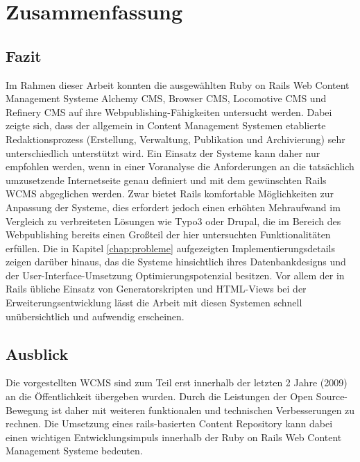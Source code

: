 \chapter{Zusammenfassung}

\section{Fazit}

Im Rahmen dieser Arbeit konnten die ausgewählten Ruby on Rails Web Content Management Systeme Alchemy CMS, Browser CMS, Locomotive CMS und Refinery CMS auf ihre Webpublishing-Fähigkeiten untersucht werden. Dabei zeigte sich, dass der allgemein in Content Management Systemen etablierte Redaktionsprozess (Erstellung, Verwaltung, Publikation und Archivierung) sehr unterschiedlich unterstützt wird.
Ein Einsatz der Systeme kann daher nur empfohlen werden, wenn in einer Voranalyse die Anforderungen an die tatsächlich umzusetzende Internetseite genau definiert und mit dem gewünschten Rails WCMS abgeglichen werden. Zwar bietet Rails komfortable Möglichkeiten zur Anpassung der Systeme, dies erfordert jedoch einen erhöhten Mehraufwand im Vergleich zu verbreiteten Lösungen wie Typo3 oder Drupal, die im Bereich des Webpublishing bereits einen Großteil der hier untersuchten Funktionalitäten erfüllen.
Die in Kapitel \ref{chap:probleme} aufgezeigten Implementierungsdetails zeigen darüber hinaus, das die Systeme hinsichtlich ihres Datenbankdesigns und der User-Interface-Umsetzung Optimierungspotenzial besitzen. Vor allem der in Rails übliche Einsatz von Generatorskripten und HTML-Views bei der Erweiterungsentwicklung lässt die Arbeit mit diesen Systemen schnell unübersichtlich und aufwendig erscheinen.

\section{Ausblick}
Die vorgestellten WCMS sind zum Teil erst innerhalb der letzten 2 Jahre (2009) an die Öffentlichkeit übergeben wurden. Durch die Leistungen der Open Source-Bewegung ist daher mit weiteren funktionalen und technischen Verbesserungen zu rechnen. Die Umsetzung eines rails-basierten Content Repository kann dabei einen wichtigen Entwicklungsimpuls innerhalb der Ruby on Rails Web Content Management Systeme bedeuten.

